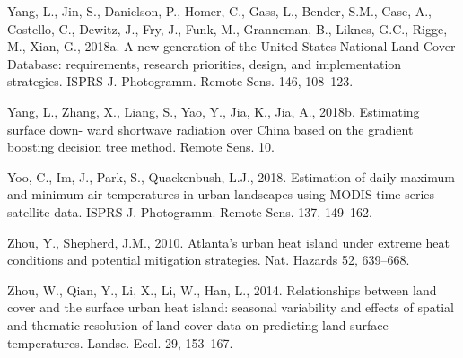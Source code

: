 \documentclass[3p,times]{elsarticle}
\begin{document}
Yang, L., Jin, S., Danielson, P., Homer, C., Gass, L., Bender, S.M., Case, A., Costello, C., Dewitz, J., Fry, J., Funk, M., Granneman, B., Liknes, G.C., Rigge, M., Xian, G., 2018a. A new generation of the United States National Land Cover Database: requirements, research priorities, design, and implementation strategies. ISPRS J. Photogramm. Remote Sens. 146, 108–123.

Yang, L., Zhang, X., Liang, S., Yao, Y., Jia, K., Jia, A., 2018b. Estimating surface down- ward shortwave radiation over China based on the gradient boosting decision tree method. Remote Sens. 10.

Yoo, C., Im, J., Park, S., Quackenbush, L.J., 2018. Estimation of daily maximum and minimum air temperatures in urban landscapes using MODIS time series satellite data. ISPRS J. Photogramm. Remote Sens. 137, 149–162.

Zhou, Y., Shepherd, J.M., 2010. Atlanta’s urban heat island under extreme heat conditions and potential mitigation strategies. Nat. Hazards 52, 639–668.

Zhou, W., Qian, Y., Li, X., Li, W., Han, L., 2014. Relationships between land cover and the surface urban heat island: seasonal variability and effects of spatial and thematic resolution of land cover data on predicting land surface temperatures. Landsc. Ecol. 29, 153–167.












\end{document}
